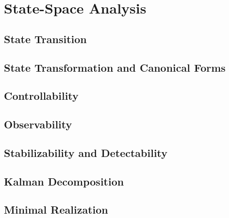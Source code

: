 \chapter{State-Space Analysis} \label{ch:state_analysis}

    \section{State Transition}

    \section{State Transformation and Canonical Forms}

    \section{Controllability}

    \section{Observability}

    \section{Stabilizability and Detectability}

    \section{Kalman Decomposition}

    \section{Minimal Realization}